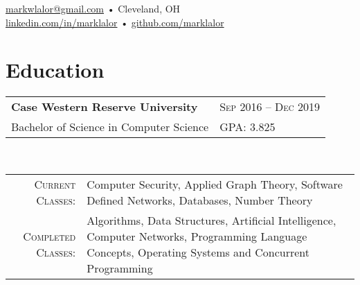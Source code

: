 \documentclass[a4paper,11pt]{article}
\begin{document}
\pagestyle{empty} %

\par{\par}
\begin{center}
\href{mailto:markwlalor@gmail.com}{markwlalor@gmail.com} • Cleveland, OH \\
\href{https://linkedin.com/in/marklalor/}{linkedin.com/in/marklalor} • \href{http://github.com/marklalor}{github.com/marklalor}
\end{center}


\section{Education}
\begin{tabular}{lp{15cm}}
\textbf{Case Western Reserve University} & \textsc{Sep} 2016 -- \textsc{Dec} 2019 \\
Bachelor of Science in Computer Science &  \textsc{GPA}: 3.825\\
\end{tabular} \\
\begin{tabular}{rp{14cm}}
\textsc{Current Classes}: & \footnotesize{Computer Security, Applied Graph Theory, Software Defined Networks, Databases, Number Theory} \\
\textsc{Completed Classes}: & \footnotesize{Algorithms, Data Structures, Artificial Intelligence, Computer Networks, Programming Language Concepts, Operating Systems and Concurrent Programming}
\end{tabular}
\\
\end{document}
